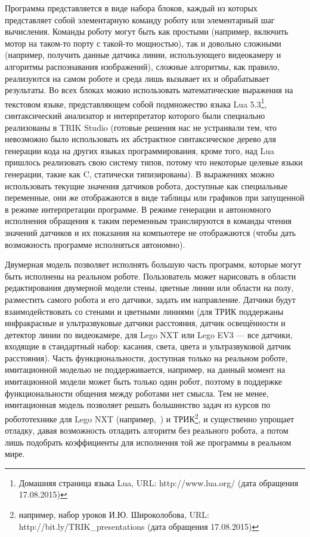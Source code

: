 \documentclass[conference]{IEEEtran}
\begin{document}
Программа представляется в виде набора блоков, каждый из которых представляет собой элементарную команду 
роботу или элементарный шаг вычисления. Команды роботу могут быть как простыми (например, включить мотор 
на таком-то порту с такой-то мощностью), так и довольно сложными (например, получить данные датчика линии, 
использующего видеокамеру и алгоритмы распознавания изображений), сложные алгоритмы, как правило, реализуются 
на самом роботе и среда лишь вызывает их и обрабатывает результаты. Во всех блоках можно использовать математические 
выражения на текстовом языке, представляющем собой подмножество языка Lua 5.3\footnote{Домашняя страница языка Lua, URL: http://www.lua.org/ (дата обращения 17.08.2015)}, 
синтаксический анализатор и интерпретатор которого были специально реализованы в TRIK Studio (готовые решения нас 
не устраивали тем, что невозможно было использовать их абстрактное синтаксическое дерево для генерации кода 
на других языках программирования, кроме того, над Lua пришлось реализовать свою систему типов, потому что 
некоторые целевые языки генерации, такие как C, статически типизированы). В выражениях можно использовать 
текущие значения датчиков робота, доступные как специальные переменные, они же отображаются в виде таблицы 
или графиков при запущенной в режиме интерпретации программе. В режиме генерации и автономного исполнения 
обращения к таким переменным транслируются в команды чтения значений датчиков и их показания на компьютере 
не отображаются (чтобы дать возможность программе исполняться автономно).

Двумерная модель позволяет исполнять большую часть программ, которые могут быть исполнены на реальном роботе. 
Пользователь может нарисовать в области редактирования двумерной модели стены, цветные линии или области на полу, 
разместить самого робота и его датчики, задать им направление. Датчики будут взаимодействовать со стенами и 
цветными линиями (для ТРИК поддержаны инфракрасные и ультразвуковые датчики расстояния, датчик освещённости и 
детектор линии по видеокамере, для Lego NXT или Lego EV3 --- все датчики, входящие в стандартный набор: касания, 
света, цвета и ультразвуковой датчик расстояния). Часть функциональности, доступная только на реальном роботе, 
имитационной моделью не поддерживается, например, на данный момент на имитационной модели может быть только один 
робот, поэтому в поддержке функциональности общения между роботами нет смысла. Тем не менее, имитационная модель 
позволяет решать большинство задач из курсов по робототехнике для Lego NXT (например,~\cite{filippov2013robotics}) 
и ТРИК\footnote{например, набор уроков И.Ю. Широколобова, URL: http://bit.ly/TRIK\_presentations (дата обращения 17.08.2015)}, 
и существенно упрощает отладку, давая возможность отладить алгоритм без реального робота, а потом лишь 
подобрать коэффициенты для исполнения той же программы в реальном мире.
\end{document}
